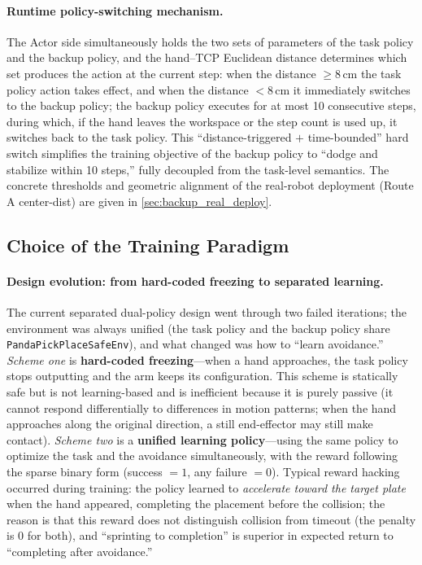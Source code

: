 \paragraph{Runtime policy-switching mechanism.} The Actor side simultaneously holds the two sets of parameters of the task policy and the backup policy, and the hand--TCP Euclidean distance determines which set produces the action at the current step: when the distance $\geq 8\,\text{cm}$ the task policy action takes effect, and when the distance $< 8\,\text{cm}$ it immediately switches to the backup policy; the backup policy executes for at most 10 consecutive steps, during which, if the hand leaves the workspace or the step count is used up, it switches back to the task policy. This ``distance-triggered $+$ time-bounded'' hard switch simplifies the training objective of the backup policy to ``dodge and stabilize within 10 steps,'' fully decoupled from the task-level semantics. The concrete thresholds and geometric alignment of the real-robot deployment (Route A center-dist) are given in \cref{sec:backup_real_deploy}.

\subsection{Choice of the Training Paradigm}\label{sec:backup_paradigm}

\paragraph{Design evolution: from hard-coded freezing to separated learning.} The current separated dual-policy design went through two failed iterations; the environment was always unified (the task policy and the backup policy share \texttt{PandaPickPlaceSafeEnv}), and what changed was how to ``learn avoidance.'' \emph{Scheme one} is \textbf{hard-coded freezing}---when a hand approaches, the task policy stops outputting and the arm keeps its configuration. This scheme is statically safe but is not learning-based and is inefficient because it is purely passive (it cannot respond differentially to differences in motion patterns; when the hand approaches along the original direction, a still end-effector may still make contact). \emph{Scheme two} is a \textbf{unified learning policy}---using the same policy to optimize the task and the avoidance simultaneously, with the reward following the sparse binary form (success $= 1$, any failure $= 0$). Typical reward hacking occurred during training: the policy learned to \emph{accelerate toward the target plate} when the hand appeared, completing the placement before the collision; the reason is that this reward does not distinguish collision from timeout (the penalty is 0 for both), and ``sprinting to completion'' is superior in expected return to ``completing after avoidance.''

